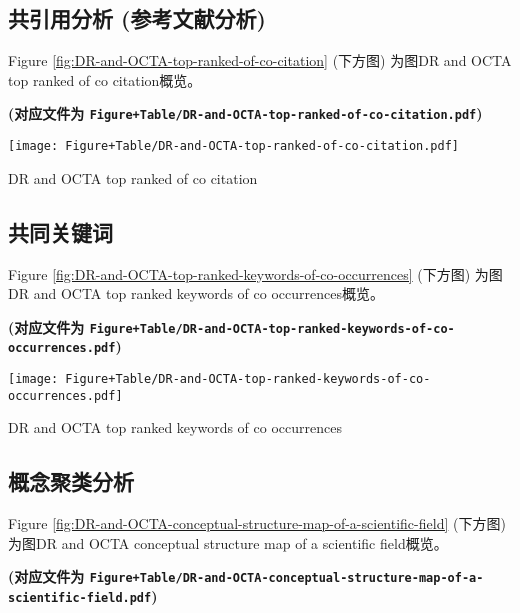 \documentclass[
]{article}
\begin{document}
\hypertarget{ux5171ux5f15ux7528ux5206ux6790-ux53c2ux8003ux6587ux732eux5206ux6790}{%
\subsection{共引用分析 (参考文献分析)}\label{ux5171ux5f15ux7528ux5206ux6790-ux53c2ux8003ux6587ux732eux5206ux6790}}

Figure \ref{fig:DR-and-OCTA-top-ranked-of-co-citation} (下方图) 为图DR and OCTA top ranked of co citation概览。

\textbf{(对应文件为 \texttt{Figure+Table/DR-and-OCTA-top-ranked-of-co-citation.pdf})}

\def\@captype{figure}
\begin{center}
\texttt{[image: Figure+Table/DR-and-OCTA-top-ranked-of-co-citation.pdf]}
\caption{DR and OCTA top ranked of co citation}\label{fig:DR-and-OCTA-top-ranked-of-co-citation}
\end{center}

\hypertarget{ux5171ux540cux5173ux952eux8bcd}{%
\subsection{共同关键词}\label{ux5171ux540cux5173ux952eux8bcd}}

Figure \ref{fig:DR-and-OCTA-top-ranked-keywords-of-co-occurrences} (下方图) 为图DR and OCTA top ranked keywords of co occurrences概览。

\textbf{(对应文件为 \texttt{Figure+Table/DR-and-OCTA-top-ranked-keywords-of-co-occurrences.pdf})}

\def\@captype{figure}
\begin{center}
\texttt{[image: Figure+Table/DR-and-OCTA-top-ranked-keywords-of-co-occurrences.pdf]}
\caption{DR and OCTA top ranked keywords of co occurrences}\label{fig:DR-and-OCTA-top-ranked-keywords-of-co-occurrences}
\end{center}

\hypertarget{ux6982ux5ff5ux805aux7c7bux5206ux6790}{%
\subsection{概念聚类分析}\label{ux6982ux5ff5ux805aux7c7bux5206ux6790}}

Figure \ref{fig:DR-and-OCTA-conceptual-structure-map-of-a-scientific-field} (下方图) 为图DR and OCTA conceptual structure map of a scientific field概览。

\textbf{(对应文件为 \texttt{Figure+Table/DR-and-OCTA-conceptual-structure-map-of-a-scientific-field.pdf})}
\end{document}
